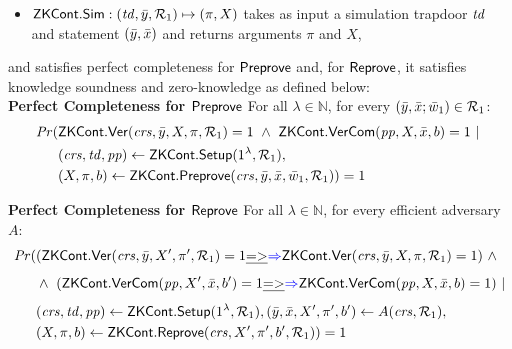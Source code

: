 \begin{definition}[ZK Continuations]
\begin{itemize}
\item ${\mathsf{ZKCont}}.{\mathsf{Sim}}: (\mathit{td}, \bar{y}, \mathcal{R}_1) \mapsto (\pi, X)$ takes as input a simulation trapdoor $\mathit{td}$ and statement $(\bar{y}, \bar{x})$ and returns 
arguments $\pi$ and $X$,
\end{itemize}
and satisfies perfect completeness for ${\mathsf{Preprove}}$ and, for ${\mathsf{Reprove}}$, it satisfies knowledge soundness and zero-knowledge as defined below:\\
\noindent \textbf{Perfect Completeness for ${\mathsf{Preprove}}$} For all $\lambda \in \mathbb{N}$, for every $(\bar{y}, \bar{x}; \bar{w}_1) \in \mathcal{R}_1$:
\begin{align*}
\mathit{Pr} (& \ZKCont.\Verify(\crs, \bar{y}, X, \pi, \relone) = 1 \ \wedge \ \ZKCont.\VerifyCom (\pp, X, \barx, b) = 1\  | \ \\ 
                   & (\crs, \tw, \pp) \leftarrow \ZKCont.\Setup (1^{\lambda}, \relone), \\ 
                   & (X, \pi, b) \leftarrow \ZKCont.\Preprove(\crs, \bar{y}, \bar{x}, \baromega_1, \relone)) = 1
\end{align*}

\noindent \textbf{Perfect Completeness for ${\mathsf{Reprove}}$} For all $\lambda \in \mathbb{N}$, for every efficient adversary $A$: 
\begin{align*}
\mathit{Pr} (& (\ZKCont.\Verify(\crs, \bar{y}, X', \pi', \relone) = 1  \handan{= >}{\Rightarrow}  \ZKCont.\Verify(\crs, \bar{y}, X, \pi, \relone) = 1)  \ \wedge \  \\
                   & \wedge \ (\ZKCont.\VerifyCom (\pp, X', \barx, b') = 1 \handan{= >}{\Rightarrow} \ZKCont.\VerifyCom (\pp, X, \barx, b) = 1) \ | \\
                   & (\crs, \tw, \pp) \leftarrow \ZKCont.\Setup (1^{\lambda}, \relone),  (\bary, \barx, X', \pi', b') \leftarrow A(\crs,\relone), \\
                   & (X, \pi, b) \leftarrow \ZKCont.\Reprove(\crs, X', \pi', b', \relone)) = 1
\end{align*}


\end{definition}
